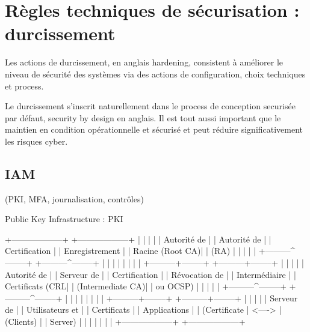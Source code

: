 \section{Règles techniques de sécurisation : durcissement}

Les actions de durcissement, en anglais hardening, consistent à améliorer le niveau de sécurité des systèmes via des actions de configuration, choix techniques et process.

Le durcissement s'inscrit naturellement dans le process de conception securisée par défaut, security by design en anglais. Il est tout aussi important que le maintien en condition opérationnelle et sécurisé et peut réduire significativement les risques cyber.

\subsection{IAM} 
(PKI, MFA, journalisation, contrôles)

Public Key Infrastructure : PKI

+------------------+        +------------------+
|                  |        |                  |
|  Autorité de     |        |  Autorité de     |
|  Certification   |        |  Enregistrement  |
|  Racine (Root CA)|        |  (RA)            |
|                  |        |                  |
+---------^--------+        +---------^--------+
          |                           |
          |                           |
          |                           |
          |                           |
+---------+--------+        +---------+--------+
|                  |        |                  |
|  Autorité de     |        |  Serveur de      |
|  Certification   |        |  Révocation de   |
|  Intermédiaire   |        |  Certificats (CRL|
|  (Intermediate CA)|       |  ou OCSP)        |
|                  |        |                  |
+---------^--------+        +---------^--------+
          |                           |
          |                           |
          |                           |
          |                           |
+---------+--------+        +---------+--------+
|                  |        |                  |
|  Serveur de      |        |  Utilisateurs et |
|  Certificats     |        |  Applications    |
|  (Certificate    | <----> |  (Clients)       |
|  Server)         |        |                  |
|                  |        |                  |
+------------------+        +------------------+

